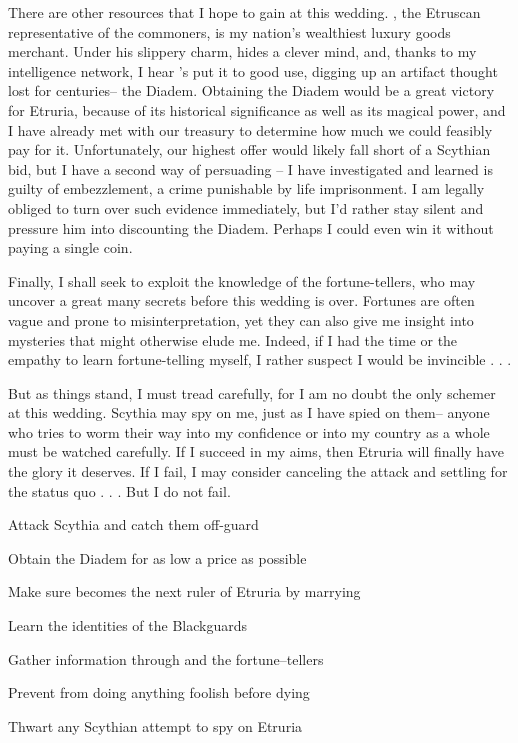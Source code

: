 \documentclass[char]{Kos}
\begin{document}
There are other resources that I hope to gain at this wedding. \cMerchant{}, the Etruscan representative of the commoners, is my nation's wealthiest luxury goods merchant. Under his slippery charm, \cMerchant{\they} hides a clever mind, and, thanks to my intelligence network, I hear \cMerchant{\they}'s put it to good use, digging up an artifact thought lost for centuries-- the Diadem. Obtaining the Diadem would be a great victory for Etruria, because of its historical significance as well as its magical power, and I have already met with our treasury to determine how much we could feasibly pay for it. Unfortunately, our highest offer would likely fall short of a Scythian bid, but I have a second way of persuading \cMerchant{}-- I have investigated \cMerchant{\them} and learned \cMerchant{\they} is guilty of embezzlement, a crime punishable by life imprisonment. I am legally obliged to turn over such evidence immediately, but I'd rather stay silent and pressure him into discounting the Diadem. Perhaps I could even win it without paying a single coin.

Finally, I shall seek to exploit the knowledge of the fortune-tellers, who may uncover a great many secrets before this wedding is over. Fortunes are often vague and prone to misinterpretation, yet they can also give me insight into mysteries that might otherwise elude me. Indeed, if I had the time or the empathy to learn fortune-telling myself, I rather suspect I would be invincible . . .

But as things stand, I must tread carefully, for I am no doubt the only schemer at this wedding. Scythia may spy on me, just as I have spied on them-- anyone who tries to worm their way into my confidence or into my country as a whole must be watched carefully. If I succeed in my aims, then Etruria will finally have the glory it deserves. If I fail, I may consider canceling the attack and settling for the status quo . . . But I do not fail.

\begin{itemz}[Goals]
 \item Attack Scythia and catch them off-guard
 \item Obtain the Diadem for as low a price as possible
 \item Make sure \cBride{} becomes the next ruler of Etruria by marrying \cGroom{}
 \item Learn the identities of the Blackguards
 \item Gather information through \cBride{} and the fortune--tellers
 \item Prevent \cPoet{} from doing anything foolish before dying
 \item Thwart any Scythian attempt to spy on Etruria
\end{itemz}

\end{document}
